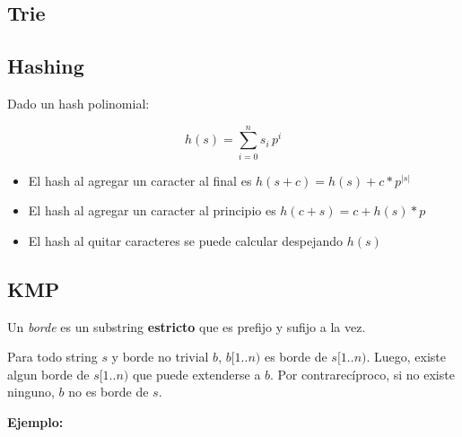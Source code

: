 
\subsection{Trie}


\subsection{Hashing}


Dado un hash polinomial:

\begin{equation*}
h(s) = \sum_{i=0}^n s_i \, p^i
\end{equation*}

\begin{itemize}
  \item El hash al agregar un caracter al final es $h(s + c) = h(s) + c * p^{|s|}$
  \item El hash al agregar un caracter al principio es $h(c + s) = c + h(s) * p$
  \item El hash al quitar caracteres se puede calcular despejando $h(s)$
\end{itemize}


\subsection{KMP}


Un \textit{borde} es un substring \textbf{estricto} que es prefijo y sufijo a la vez.

Para todo string $s$ y borde no trivial $b$, $b[1..n)$ es borde de $s[1..n)$. Luego, existe algun borde de $s[1..n)$ que puede extenderse a $b$. Por contrarecíproco, si no existe ninguno, $b$ no es borde de $s$.

\textbf{Ejemplo:}

